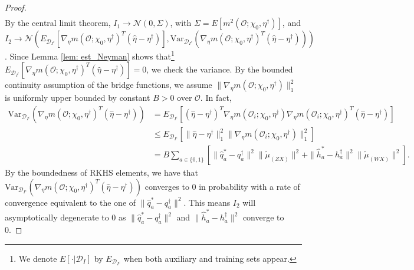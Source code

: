 \begin{proof}
\begin{align*}
    \end{align*}
    By the central limit theorem, $I_1\longrightarrow\mathcal{N}(0,\Sigma)$, with $\Sigma=E[m^2(\mathcal{O};\chi_0,\eta^{\dagger})]$, 
    and $I_2\longrightarrow\mathcal{N}(E_{\mathcal{D}_{I^c}}[\nabla_{\eta}m(\mathcal{O};\chi_0,\eta^{\dagger})^T(\widehat{\eta}-\eta^{\dagger})], \text{Var}_{\mathcal{D}_{I^c}}(\nabla_{\eta}m(\mathcal{O};\chi_0,\eta^{\dagger})^T(\widehat{\eta}-\eta^{\dagger})))$. 
    Since Lemma \ref{lem: est_Neyman} shows that\footnote{We denote $E[\cdot|\mathcal{D}_I]$ by $E_{\mathcal{D}_{I^c}}$ when both auxiliary and training sets appear.} $E_{\mathcal{D}_{I^c}}[\nabla_{\eta}m(\mathcal{O};\chi_0,\eta^{\dagger})^T(\widehat{\eta}-\eta^{\dagger})]=0$, 
    we check the variance. 
    By the bounded continuity assumption of the bridge functions, we assume $\|\nabla_{\eta}m(\mathcal{O};\chi_0,\eta^{\dagger})\|_1^2$ is uniformly upper bounded by constant $B>0$ over $\mathcal{O}$.
    In fact, 
    \begin{align*}
        \text{Var}_{\mathcal{D}_{I^c}}(\nabla_{\eta}m(\mathcal{O};\chi_0,\eta^{\dagger})^T(\widehat{\eta}-\eta^{\dagger})) &= E_{\mathcal{D}_{I^c}}[(\widehat{\eta}-\eta^{\dagger})^T\nabla_{\eta}m(\mathcal{O}_i;\chi_0,\eta^{\dagger})\nabla_{\eta}m(\mathcal{O}_i;\chi_0,\eta^{\dagger})^T(\widehat{\eta}-\eta^{\dagger})] \\
                                                                                                                             &\leq E_{\mathcal{D}_{I^c}}[\|\widehat{\eta}-\eta^{\dagger}\|^2_1\|\nabla_{\eta}m(\mathcal{O}_i;\chi_0,\eta^{\dagger})\|^2_1] \\
                                                                                                                             &= B\sum_{a\in\{0,1\}}\left[\|\widehat{q}_a^*-q_a^{\dagger}\|^2\|\tilde{\mu}_{(ZX)}\|^2+\|\widehat{h}_a^*-h_a^{\dagger}\|^2\|\tilde{\mu}_{(WX)}\|^2\right].
    \end{align*}
    By the boundedness of RKHS elements, we have that $\text{Var}_{\mathcal{D}_{I^c}}(\nabla_{\eta}m(\mathcal{O};\chi_0,\eta^{\dagger})^T(\widehat{\eta}-\eta^{\dagger}))$ converges to 0 in probability 
    with a rate of convergence equivalent to the one of $\|\widehat{q}_a^*-q_a^{\dagger}\|^2$. 
    This means $I_2$ will asymptotically degenerate to 0 as $\|\widehat{q}_a^*-q_a^{\dagger}\|^2$ and $\|\widehat{h}_a^*-h_a^{\dagger}\|^2$ converge to 0.


\end{proof}
